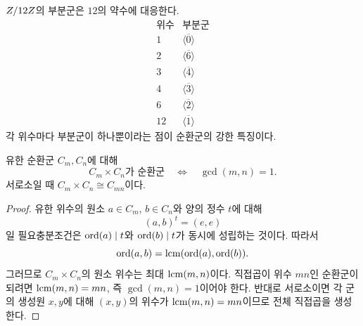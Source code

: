 \begin{example}
$Z/12Z$의 부분군은 $12$의 약수에 대응한다.
\[
\begin{array}{c|c}
\text{위수} & \text{부분군}\\
\hline
1 & \langle\overline0\rangle\\
2 & \langle\overline6\rangle\\
3 & \langle\overline4\rangle\\
4 & \langle\overline3\rangle\\
6 & \langle\overline2\rangle\\
12 & \langle\overline1\rangle
\end{array}
\]
각 위수마다 부분군이 하나뿐이라는 점이 순환군의 강한 특징이다.
\end{example}

\begin{proposition}
유한 순환군 $C_m,C_n$에 대해
\[
  C_m\times C_n\text{가 순환군}
  \quad\Longleftrightarrow\quad
  \gcd(m,n)=1.
\]
서로소일 때 $C_m\times C_n\cong C_{mn}$이다.
\end{proposition}

\begin{proof}
유한 위수의 원소 $a\in C_m$, $b\in C_n$와 양의 정수 $t$에 대해
\[
  (a,b)^t=(e,e)
\]
일 필요충분조건은 $\operatorname{ord}(a)\mid t$와 $\operatorname{ord}(b)\mid t$가 동시에 성립하는 것이다. 따라서
\[
  \operatorname{ord}(a,b)=\operatorname{lcm}(\operatorname{ord}(a),\operatorname{ord}(b)).
\]
그러므로 $C_m\times C_n$의 원소 위수는 최대 $\operatorname{lcm}(m,n)$이다. 직접곱이 위수 $mn$인 순환군이 되려면 $\operatorname{lcm}(m,n)=mn$, 즉 $\gcd(m,n)=1$이어야 한다. 반대로 서로소이면 각 군의 생성원 $x,y$에 대해 $(x,y)$의 위수가 $\operatorname{lcm}(m,n)=mn$이므로 전체 직접곱을 생성한다.
\end{proof}
